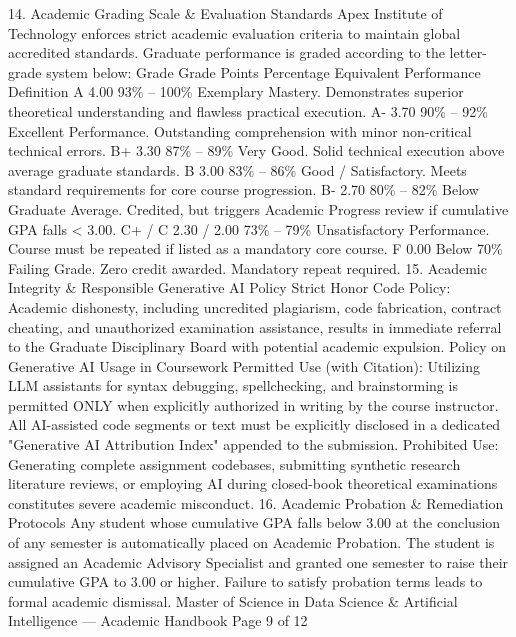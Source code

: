 \documentclass[12pt]{article}
\begin{document}
14. Academic Grading Scale \& Evaluation Standards
Apex Institute of Technology enforces strict academic evaluation criteria to maintain global accredited standards.
Graduate performance is graded according to the letter-grade system below:
Grade
Grade
Points
Percentage
Equivalent
Performance Definition
A
4.00
93\% – 100\%
Exemplary Mastery. Demonstrates superior theoretical understanding and
flawless practical execution.
A-
3.70
90\% – 92\%
Excellent Performance. Outstanding comprehension with minor non-critical
technical errors.
B+
3.30
87\% – 89\%
Very Good. Solid technical execution above average graduate standards.
B
3.00
83\% – 86\%
Good / Satisfactory. Meets standard requirements for core course progression.
B-
2.70
80\% – 82\%
Below Graduate Average. Credited, but triggers Academic Progress review if
cumulative GPA falls < 3.00.
C+ /
C
2.30 / 2.00
73\% – 79\%
Unsatisfactory Performance. Course must be repeated if listed as a mandatory
core course.
F
0.00
Below 70\%
Failing Grade. Zero credit awarded. Mandatory repeat required.
15. Academic Integrity \& Responsible Generative AI Policy
Strict Honor Code Policy: Academic dishonesty, including uncredited plagiarism, code fabrication, contract
cheating, and unauthorized examination assistance, results in immediate referral to the Graduate Disciplinary
Board with potential academic expulsion.
Policy on Generative AI Usage in Coursework
Permitted Use (with Citation): Utilizing LLM assistants for syntax debugging, spellchecking, and brainstorming is
permitted ONLY when explicitly authorized in writing by the course instructor. All AI-assisted code segments or text must
be explicitly disclosed in a dedicated "Generative AI Attribution Index" appended to the submission.
Prohibited Use: Generating complete assignment codebases, submitting synthetic research literature reviews, or
employing AI during closed-book theoretical examinations constitutes severe academic misconduct.
16. Academic Probation \& Remediation Protocols
Any student whose cumulative GPA falls below 3.00 at the conclusion of any semester is automatically placed on
Academic Probation. The student is assigned an Academic Advisory Specialist and granted one semester to raise
their cumulative GPA to 3.00 or higher. Failure to satisfy probation terms leads to formal academic dismissal.
Master of Science in Data Science \& Artificial Intelligence — Academic Handbook
Page 9 of 12
\end{document}
